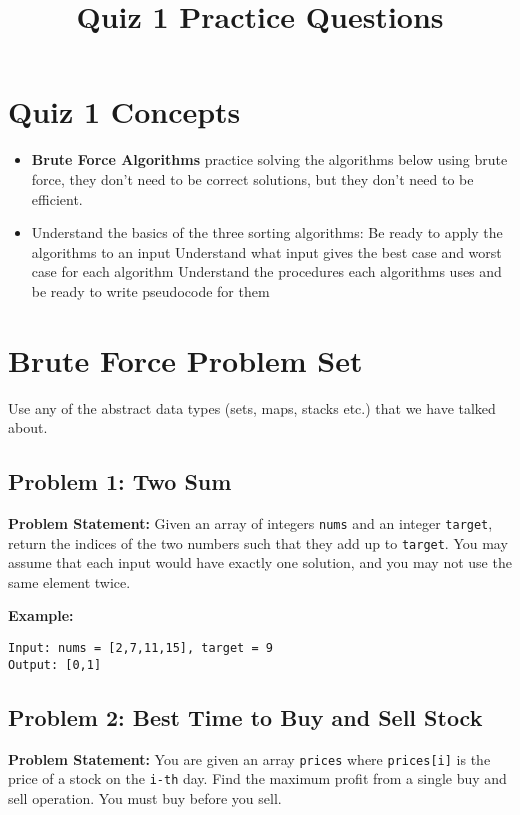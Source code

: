 \documentclass[12pt]{article}
\title{Quiz 1 Practice Questions}
\date{}
\begin{document}
\section*{Quiz 1 Concepts}
\begin{itemize}
  \item \textbf{Brute Force Algorithms} practice solving the algorithms below using brute force, they don't need to be correct solutions, but they don't need to be efficient.
  \item Understand the basics of the three sorting algorithms:\newline
Be ready to apply the algorithms to an input\newline
Understand what input gives the best case and worst case for each algorithm\newline
Understand the procedures each algorithms uses and be ready to write pseudocode for them
\end{itemize}

\section*{Brute Force Problem Set}
Use any of the abstract data types (sets, maps, stacks etc.) that we have talked about.
\subsection*{Problem 1: Two Sum}
\textbf{Problem Statement:} Given an array of integers \texttt{nums} and an integer \texttt{target}, return the indices of the two numbers such that they add up to \texttt{target}. You may assume that each input would have exactly one solution, and you may not use the same element twice.

\textbf{Example:}
\begin{verbatim}
Input: nums = [2,7,11,15], target = 9
Output: [0,1]
\end{verbatim}


\vspace{1cm}

\subsection*{Problem 2: Best Time to Buy and Sell Stock}
\textbf{Problem Statement:} You are given an array \texttt{prices} where \texttt{prices[i]} is the price of a stock on the \texttt{i-th} day. Find the maximum profit from a single buy and sell operation. You must buy before you sell.
\end{document}
